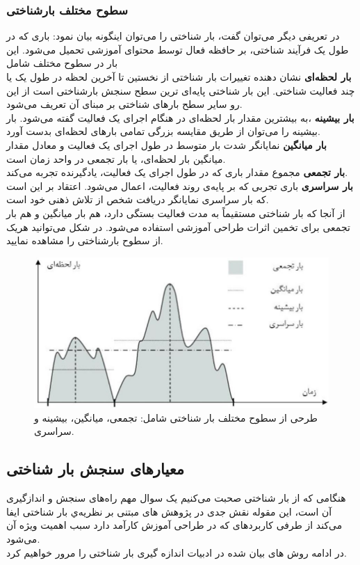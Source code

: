 \subsubsection{سطوح مختلف بارشناختی}
در تعریفی دیگر می‌توان گفت، بار شناختی را می‌توان اینگونه بیان نمود: باری که در طول یک فرآیند شناختی، بر حافظه فعال توسط محتوای آموزشی تحمیل می‌شود. این بار در سطوح مختلف شامل
\\
\textbf{بار لحظه‌ای}
نشان دهنده تغییرات بار شناختی از نخستین تا آخرین لحظه در طول یک یا چند فعالیت شناختی. این بار شناختی پایه‌ای ترین سطح سنجش بارشناختی است از این رو سایر سطح بارهای شناختی بر مبنای آن تعریف می‌شود.
\\
\textbf{بار بیشینه}
،به بیشترین مقدار بار لحظه‌ای در هنگام اجرای یک فعالیت گفته می‌شود. بار بیشینه را می‌توان از طریق مقایسه بزرگی تمامی بارهای لحظه‌ای بدست آورد.
\\
\textbf{بار میانگین}
نمایانگر شدت بار متوسط در طول اجرای یک فعالیت و معادل مقدار میانگین بار لحظه‌ای، یا بار تجمعی در واحد زمان است.
\\
\textbf{بار تجمعی}
مجموع مقدار باری که در طول اجرای یک فعالیت، یادگیرنده تجربه می‌کند.
\\
\textbf{بار سراسری}
باری تجربی که بر پایه‌ی روند فعالیت، اعمال می‌شود. اعتقاد بر این است که بار سراسری نمایانگر دریافت شخص از تلاش ذهنی خود است.
\\
از آنجا که بار شناختی مستقیماً به مدت فعالیت بستگی دارد، هم بار میانگین و هم بار تجمعی برای تخمین اثرات طراحی آموزشی استفاده می‌شود.
\cite{antonenko2010using}
در شکل 
می‌توانید هریک از سطوح بارشناختی را مشاهده نمایید.
\begin{figure}[htbp]
	\centering
	\includegraphics[width=0.7\linewidth]{figures/cl_levels}
	\caption[سطوح مختلف بار شناختی]{طرحی از سطوح مختلف بار شناختی شامل: تجمعی، میانگین، بیشینه و سراسری.}
	\label{fig:cllevels}
\end{figure}


\subsection{معیارهای سنجش بار شناختی}
هنگامی که از بار شناختی صحبت می‌کنیم یک سوال مهم راه‌های سنجش و اندازگیری آن است، این مقوله نقش جدی در پژوهش های مبتنی بر نظریه‌ي بار شناختی ایفا می‌کند از طرفی کاربردهای که در طراحی آموزش کارآمد دارد سبب اهمیت ویژه آن می‌شود.
\cite{korbach2017measurement}
\\
در ادامه روش های بیان شده در ادبیات اندازه گیری بار شناختی را مرور خواهیم کرد.

